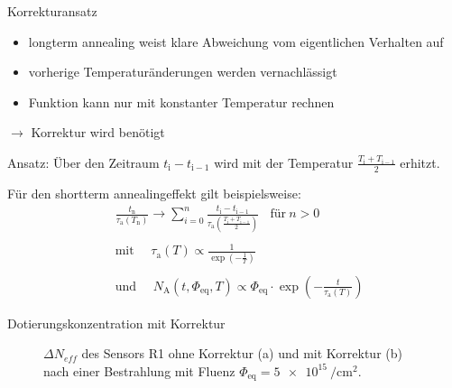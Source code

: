 \documentclass[aspectratio=1610, 9pt]{beamer}
\begin{document}
\begin{frame}{Korrekturansatz}
  \begin{itemize}
    \item longterm annealing weist klare Abweichung vom eigentlichen Verhalten auf
    \medskip
    \item vorherige Temperaturänderungen werden vernachlässigt
    \medskip
    \item Funktion kann nur mit konstanter Temperatur rechnen
  \end{itemize}
  \medskip
  $\rightarrow$ Korrektur wird benötigt
  \medskip

  Ansatz: Über den Zeitraum $t_{\mathrm{i}} - t_{\mathrm{i-1}}$ wird mit der Temperatur $\frac{T_{\mathrm{i}} +T_{\mathrm{i-1}}}{2}$ erhitzt.

  Für den shortterm annealingeffekt gilt beispielsweise:
  \begin{align*}
    &\frac{t_{\mathrm{n}}}{\tau_{\mathrm{a}}(T_{\mathrm{n}})} \rightarrow \sum_{i=0}^n  \frac{t_{\mathrm{i}} - t_{\mathrm{i-1}}}{\tau_{\mathrm{a}}(\frac{T_{\mathrm{i}} +T_{\mathrm{i-1}}}{2})} \:\:\:\: \text{für} \: n>0 \\
    \\
    &\text{mit} \:\:\:\:\:\: \tau_{\mathrm{a}}(T) \propto \frac{1}{\exp{\left(-\frac{1}{T}\right)}} \\
    \\
    &\text{und}  \:\:\:\:\:\: N_{\mathrm{A}}(t, \Phi_{\mathrm{eq}}, T)     \propto \Phi_{\mathrm{eq}} \cdot \exp{\left(-\frac{t}{\tau_{\mathrm{a}}(T)}\right) }
  \end{align*}
\end{frame}

\begin{frame}{Dotierungskonzentration mit Korrektur}
  \begin{figure}
  \caption{$\Delta N_{eff}$ des Sensors R1 ohne Korrektur (a) und mit Korrektur (b) nach einer Bestrahlung mit Fluenz $\Phi_{\mathrm{eq}} = \SI{5e15}{\per\centi\meter\squared}.$}
  \end{figure}
\end{frame}
\end{document}
